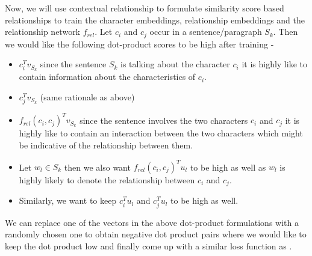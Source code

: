\documentclass[11pt,a4paper]{article}
\begin{document}
Now, we will use contextual relationship to formulate similarity score based relationships to train the character embeddings, relationship embeddings and the relationship network $f_{rel}$.
Let $c_i$ and $c_j$ occur in a sentence/paragraph $S_k$.  Then we would like the following dot-product scores to be high after training -
\begin{itemize}
  \item $c_i^Tv_{S_k}$ since the sentence $S_k$ is talking about the character $c_i$ it is highly like to contain information about the characteristics of $c_i$.
  \item $c_j^Tv_{S_k}$ (same rationale as above)
  \item $f_{rel}(c_i,c_j)^Tv_{S_k}$ since the sentence involves the two characters $c_i$ and $c_j$ it is highly like to contain an interaction between the two characters which might be indicative of the relationship between them.
  \item Let $w_l \in S_k$ then we also want $f_{rel}(c_i,c_j)^Tu_{l}$ to be high as well as $w_l$ is highly likely to denote the relationship between $c_i$ and $c_j$.
  \item Similarly, we want to keep $c_i^Tu_{l}$ and $c_j^Tu_{l}$ to be high as well.
\end{itemize}
We can replace one of the vectors in the above dot-product formulations with a randomly chosen one to obtain negative dot product pairs where we would like to keep the dot product low and finally come up with a similar loss function as \wtov.



\clearpage

\appendix
\end{document}
